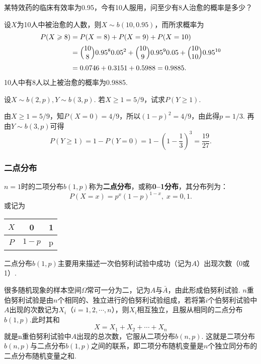 \begin{example}
  某特效药的临床有效率为0.95，今有10人服用，问至少有8人治愈的概率是多少？
\end{example}
\begin{solution}
  设$X$为10人中被治愈的人数，则$X\sim b(10,0.95)$，而所求概率为
  \begin{align*}
    P(X \ge 8) & = P(X = 8) + P(X = 9) + P(X = 10)\\
    & = \Binom{10}80.95^80.05^2 + \Binom{10}90.95^90.05 + \Binom{10}{10}0.95^{10} \\
    & = 0.0746 + 0.3151 + 0.5988 = 0.9885.
  \end{align*}
  10人中有8人以上被治愈的概率为0.9885.
\end{solution}

\begin{example}
  设$X\sim b(2,p),Y\sim b(3,p)$. 若$X\ge1=5/9$，试求$P(Y\ge1).$
\end{example}
\begin{solution}
  由$X\ge1=5/9$，知$P(X=0)=4/9$，所以$(1-p)^2=4/9$，由此得$p=1/3$. 再由$Y\sim b(3,p)$可得
  \[
    P(Y\ge1) = 1 - P(Y=0) = 1 - \left( 1 - \frac13 \right)^3 = \frac{19}{27}.
  \]
\end{solution}

\subsubsection{二点分布}
$n=1$时的二项分布$b(1,p)$称为\textbf{二点分布}，或称\textbf{0--1分布}，其分布列为：
\begin{equation}\label{eq2.4.2}
  P(X = x) = p^x(1-p)^{1-x},\; x = 0,1.
\end{equation}
或记为
\begin{center}
  \begin{tabular}{c|cc}
    $X$ & 0 & 1 \\
    \hline
    $P$ & $1-p$ & p
  \end{tabular}
\end{center}

二点分布$b(1,p)$主要用来描述一次伯努利试验中成功（记为$A$）出现次数（0或1）.

很多随机现象的样本空间$\Omega$常可一分为二，记为$A$与$\bar A$，由此形成伯努利试验. $n$重伯努利试验是由$n$个相同的、独立进行的伯努利试验组成，若将第$i$个伯努利试验中$A$出现的次数记为$X_i$（$i=1,2,\cdots,n$），则$X_i$相互独立，且服从相同的二点分布$b(1,p)$.此时其和
\[
  X = X_1 + X_2 + \cdots + X_n
\]
就是n重伯努利试验中$A$出现的总次数，它服从二项分布$b(n,p)$. 这就是二项分布$b(n,p)$与二点分布$b(1,p)$之间的联系，即二项分布随机变量是$n$个独立同分布的二点分布随机变量之和.

